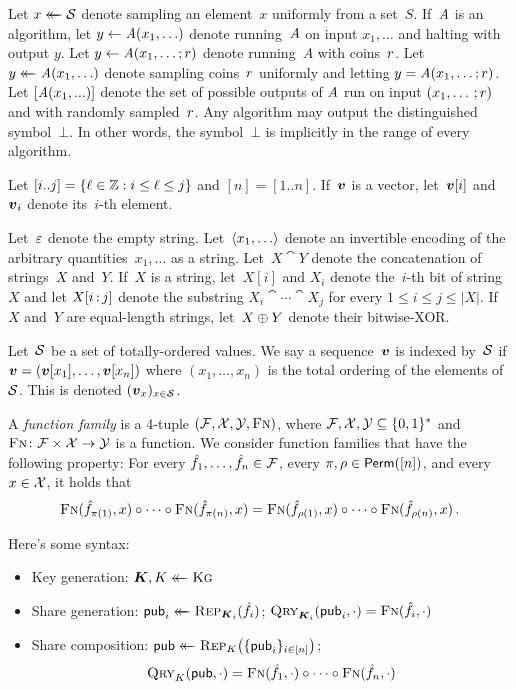 %
\label{sec:syntax}

Let $x \mathrel{\leftarrow\mkern-14mu\leftarrow} \mathcal{S}$ denote sampling an element~$x$ uniformly from a set~$S$.
%
If~$\mathit{A}$ is an algorithm, let $y \gets \mathit{A}(x_1, \ldots)$ denote
running~$\mathit{A}$ on input $x_1, \ldots$ and halting with output $y$.
%
Let $y \gets \mathit{A}(x_1, \ldots; r)$ denote running~$A$ with coins~$r$.
Let $y \mathrel{\leftarrow\mkern-14mu\leftarrow} \mathit{A}(x_1, \ldots)$ denote sampling coins~$r$ uniformly and
letting $y = \mathit{A}(x_1, \ldots; r)$.
%
Let $[\mathit{A}(x_1, ...)]$ denote the set of possible outputs of $\mathit{A}$ run on input
$(x_1, \ldots \,; r)$ and with randomly sampled~$r$.
%
Any algorithm may output the distinguished symbol~$\bot$. In other words, the
symbol~$\bot$ is implicitly in the range of every algorithm.

Let $[i..j] = \{ \ell \in \mathbb{Z} : i \le \ell \le j \}$ and $[n] = [1..n]$.
%
If~$\vv$ is a vector, let~$\vv[i]$ and $\vv_i$ denote its~$i$-th element.

Let~$\varepsilon$ denote the empty string.
%
Let~$\str(x_1, \ldots)$ denote an invertible encoding of the arbitrary
quantities~$x_1, \ldots$ as a string.
%
Let~$X \cat Y$ denote the concatenation of strings~$X$ and~$Y$.
%
If~$X$ is a string, let~$X[i]$ and $X_i$ denote the~$i$-th bit of string~$X$ and
let $\substr(X,i,j)$ denote the substring $X_i \cat \cdots \cat X_j$ for every $1
\leq i \leq j \leq |X|$.
%
If~$X$ and~$Y$ are equal-length strings, let~$X \mathbin{\oplus} Y$ denote their
bitwise-XOR.

Let~$\mathcal{S}$ be a set of totally-ordered values. We say a sequence~$\vv$ is
indexed by~$\mathcal{S}$ if $\vv = (\vv[x_1], \ldots, \vv[x_n])$ where $(x_1, \ldots,
x_n)$ is the total ordering of the elements of~$\mathcal{S}$. This is denoted
$(\vv_x)_{x\in \setS}$.

\begin{definition}\rm
  A \emph{function family} is a 4-tuple $(\mathcal{F}, \mathcal{X}, \mathcal{Y}, \textsc{Fn})$, where $\mathcal{F},
  \mathcal{X}, \mathcal{Y} \subseteq \{0,1\}^*$ and $\textsc{Fn} \colon \mathcal{F} \times \mathcal{X} \to \mathcal{Y}$ is a
  function.
  We consider function families that have the following property:
  For every $\hat{f}_1, \ldots, \hat{f}_n \in \mathcal{F}$, every $\pi, \rho \in
  \mathsf{Perm}([n])$, and every $x \in \mathcal{X}$, it holds that
  \[
    \textsc{Fn}(\hat{f}_{\pi(1)}, x) \circ \cdots \circ \textsc{Fn}(\hat{f}_{\pi(n)}, x) =
    \textsc{Fn}(\hat{f}_{\rho(1)}, x) \circ \cdots \circ \textsc{Fn}(\hat{f}_{\rho(n)}, x) \,.
  \]
\end{definition}

\begin{definition}\rm
  Here's some syntax:
  \begin{itemize}
    \item Key generation: $\kk, \k \getsr \Kg$
    \item Share generation: $\pub_i \getsr \Rep_{\kk_i}(\hat{f}_i)$;
      $\Qryx(\kk_i, \pub_i, \cdot) = \Fn(\hat{f}_i, \cdot)$
    \item Share composition: $\pub \getsr \Repx(\k, \{\pub_i\}_{i\in[n]})$;
      \[\Qryx(\k, \pub, \cdot) = \Fn(\hat{f}_1, \cdot) \circ \cdots \circ
      \Fn(\hat{f}_n, \cdot)\]

  \end{itemize}
\end{definition}
